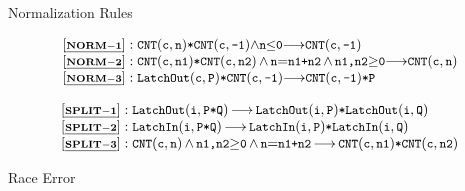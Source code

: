 \begin{frame}{Normalization Rules}
\begin{center}
\begin{small}
\[
\begin{array}{l}
\BSPEC{\normrulen{1}:

\CNT{c}{n} {\sep} \CNT{c}{-1} {\wedge} \code{n\sm{\leq}0} {\longrightarrow} \CNT{c}{-1}}
\\
\BSPEC{\normrulen{2}:
\CNT{c}{n1} {\sep} \CNT{c}{n2}\, {\wedge}\, \code{n}{=}\code{n1{+}n2} \,{\wedge}\, \code{n1,n2}{\geq}\code{0} 
{\longrightarrow} \CNT{c}{n}}
\\
\BSPEC{\normrulen{3}:
\LatchOut{c}{P} {\sep} \CNT{c}{-1}  {\longrightarrow} \CNT{c}{-1}{\sep}\code{P}}
\end{array}
\]
\end{small}
\end{center}
\pause
\begin{small}
\[
\begin{array}{l}
\BSPEC{\splitrulen{1}:
\LatchOut{i}{P{\sep}Q} \,{\longrightarrow}\, \LatchOut{i}{P} {\sep}\LatchOut{i}{Q}}
\\
\BSPEC{\splitrulen{2}:
\LatchIn{i}{P{\sep}Q} \,{\longrightarrow}\, \LatchIn{i}{P} {\sep}\LatchIn{i}{Q}}
\\
\BSPEC{\splitrulen{3}:
\CNT{c}{n} \,{\wedge}\, %
\code{n1,n2}{\geq}\code{0}  \, {\wedge}\, \code{n}{=}\code{n1{+}n2} 
\,{\longrightarrow}\,
\CNT{c}{n1} {\sep} \CNT{c}{n2} }
\end{array}
\]
\end{small}
\end{frame}

\begin{frame}[shrink=17]{Race Error}
\pause
    
\end{frame}

